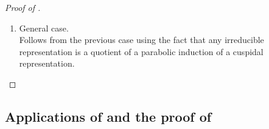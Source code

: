 \documentclass[12pt,a4paper]{amsart}%
\newcommand{\DimaB}[1]{{{#1}}}
\begin{document}
\begin{proof}[Proof of ]
\begin{enumerate}[{Case} 1.]
\begin{align*}
i_M^G(\rho)^{G_{-n}}
&\overset{\text{Lem } \ref{lem:iota.gen}}{=}\cH^{G_0}_{G_{-n}}(G)\cdot ( \iota_{M,(G_{-n})^-,\rho}(\rho^{(G_{-n})_M}))\\
&\overset{\text{Lem \ref{lem:cGM}\eqref{lem:cGM:2}}}{=} \cH^{G_0}_{G_{-n}}(G)\cdot ( \iota_{M,(G_{-n})^-,\rho}(\rho^{M_{-n}}))\\
&\overset{\eqref{eq:rho.M.van}}{=}0
\end{align*}
and there is nothing to prove. Let $n\geq n_0$. Then:
\begin{align*}
\pi^{G_{-n}}
&\overset{\text{Lem~\ref{lem:iota.gen}}}{=}
\cH_{G_{-n}}^{G_0}(G)\Bigl(\pi^{G_{-n}}\cap\iota_{M,(G_{-n})^-,\rho}\bigl(\rho^{(G_{-n})_M}\bigr)\Bigr)\\
&\overset{\text{Lem~\ref{lem:cGM}\eqref{lem:cGM:2}}}{=}
\cH_{G_{-n}}^{G_0}(G)\Bigl(\pi^{G_{-n}}\cap\iota_{M,(G_{-n})^-,\rho}\bigl(\rho^{M_{-n}}\bigr)\Bigr)\\
&\overset{\text{Thm~\ref{thm:supph.cusp}}}{\subset}
\cH_{G_{-n}}^{G_0}(G)\Bigl(\pi^{G_{-n}}\cap\iota_{M,(G_{-n})^-,\rho}\bigl(\cH_{M_{-n}}^{M_{c_{cgen}(\rho)n}}(M)\,v_{cgen}(\rho)\bigr)\Bigr)\\
&\overset{\text{Cor~\ref{cor:c.iota}\eqref{cor:c.iota:2}}}{\subset}
\cH_{G_{-n}}^{G_0}(G)\,\cH_{G_{-n}}^{G_{c_{\iota}c_{cgen}(\rho)n}}(G)\bigl(\iota_{M,(G_{-n_0})^-,\rho}(v_{cgen}(\rho))\bigr)\\
&\overset{\text{Lem~\ref{lem:Gn.product}}}{\subset}
\cH_{G_{-n}}^{G_{c_{gen}(\pi)n}}(G)\bigl(v_{gen}(\pi)\bigr),
\end{align*}
where \eqref{cor:c.iota:2} is applied with $n_0$, $n$ and $c_{cgen}(\rho)n$ in the
roles of $n$, $m$ and $k$.

    \item General case.\\
     Follows from the previous case using the fact that any irreducible representation is  a quotient  of  a parabolic induction of a cuspidal representation.
\end{enumerate}
\end{proof}

\subsection{Applications of  \DimaB{and the proof of }}\label{ssec:app.supph}
\end{document}
